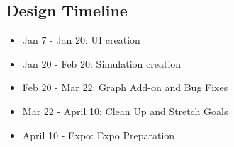 \documentclass[onecolumn, draftclsnofoot,10pt, compsoc]{IEEEtran}
\begin{document}







\subsection{Design Timeline}
\begin{itemize}
    \item Jan 7 - Jan 20: UI creation
    \item Jan 20 - Feb 20: Simulation creation
    \item Feb 20 - Mar 22: Graph Add-on and Bug Fixes
    \item Mar 22 - April 10: Clean Up and Stretch Goals
    \item April 10 - Expo: Expo Preparation
\end{itemize}
\end{document}
